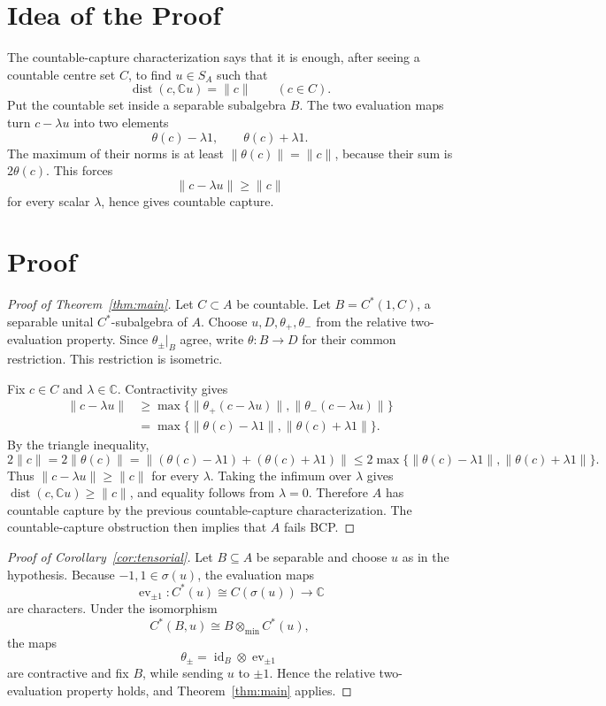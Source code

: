 \documentclass[11pt]{article}
\newcommand{\C}{\mathbb C}
\newcommand{\dist}{\operatorname{dist}}
\newcommand{\otmin}{\otimes_{\min}}
\begin{document}
\section*{Idea of the Proof}

The countable-capture characterization says that it is enough, after seeing a
countable centre set \(C\), to find \(u\in S_A\) such that
\[
        \dist(c,\C u)=\|c\|\qquad(c\in C).
\]
Put the countable set inside a separable subalgebra \(B\).  The two evaluation
maps turn \(c-\lambda u\) into two elements
\[
        \theta(c)-\lambda 1,
        \qquad
        \theta(c)+\lambda 1.
\]
The maximum of their norms is at least \(\|\theta(c)\|=\|c\|\), because their
sum is \(2\theta(c)\).  This forces
\[
        \|c-\lambda u\|\ge \|c\|
\]
for every scalar \(\lambda\), hence gives countable capture.

\section*{Proof}

\begin{proof}[Proof of Theorem~\ref{thm:main}]
Let \(C\subset A\) be countable.  Let \(B=C^*(1,C)\), a separable unital
\(C^*\)-subalgebra of \(A\).  Choose \(u,D,\theta_+,\theta_-\) from the
relative two-evaluation property.  Since \(\theta_\pm|_B\) agree, write
\(\theta:B\to D\) for their common restriction.  This restriction is
isometric.

Fix \(c\in C\) and \(\lambda\in\C\).  Contractivity gives
\[
\begin{aligned}
        \|c-\lambda u\|
        &\ge
        \max\{\|\theta_+(c-\lambda u)\|,
              \|\theta_-(c-\lambda u)\|\}\\
        &=
        \max\{\|\theta(c)-\lambda1\|,
              \|\theta(c)+\lambda1\|\}.
\end{aligned}
\]
By the triangle inequality,
\[
        2\|c\|
        =
        2\|\theta(c)\|
        =
        \|(\theta(c)-\lambda1)+(\theta(c)+\lambda1)\|
        \le
        2\max\{\|\theta(c)-\lambda1\|,\|\theta(c)+\lambda1\|\}.
\]
Thus \(\|c-\lambda u\|\ge\|c\|\) for every \(\lambda\).  Taking the infimum
over \(\lambda\) gives \(\dist(c,\C u)\ge\|c\|\), and equality follows from
\(\lambda=0\).  Therefore \(A\) has countable capture by the previous
countable-capture characterization.  The countable-capture obstruction then
implies that \(A\) fails BCP.
\end{proof}

\begin{proof}[Proof of Corollary~\ref{cor:tensorial}]
Let \(B\subseteq A\) be separable and choose \(u\) as in the hypothesis.
Because \(-1,1\in\sigma(u)\), the evaluation maps
\[
        \operatorname{ev}_{\pm1}:C^*(u)\cong C(\sigma(u))\to\C
\]
are characters.  Under the isomorphism
\[
        C^*(B,u)\cong B\otmin C^*(u),
\]
the maps
\[
        \theta_\pm=\operatorname{id}_B\otimes\operatorname{ev}_{\pm1}
\]
are contractive and fix \(B\), while sending \(u\) to \(\pm1\).  Hence the
relative two-evaluation property holds, and Theorem~\ref{thm:main} applies.
\end{proof}
\end{document}
